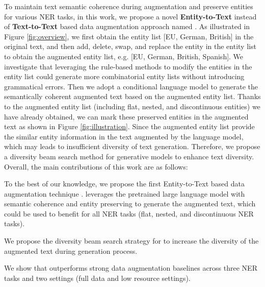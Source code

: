 To maintain text semantic coherence during augmentation and preserve entities for various NER tasks, in this work, we propose a novel \textbf{Entity-to-Text} instead of \textbf{Text-to-Text} based data augmentation approach named {\modelname}. As illustrated in Figure \ref{fig:overview}, we first obtain the entity list [EU, German, British] in the original text, and then add, delete, swap, and replace the entity in the entity list to obtain the augmented entity list, e.g. [EU, German, British, Spanish]. We investigate that leveraging the rule-based methods to modify the entities in the entity list could generate more combinatorial entity lists without introducing grammatical errors. Then we adopt a conditional language model to generate the semantically coherent augmented text based on the augmented entity list. Thanks to the augmented entity list (including flat, nested, and discontinuous entities) we have already obtained, we can mark these preserved entities in the augmented text as shown in Figure \ref{fig:illustration}. Since the augmented entity list provide the 
similar entity information in the text augmented by the language model, which may leads to insufficient diversity of text generation. Therefore, we propose a diversity beam search method for generative models to enhance text diversity.
Overall, the main contributions of this work are as follows:
\squishlist
\item To the best of our knowledge, we propose the first Entity-to-Text based data augmentation technique {\modelname}. {\modelname} leverages the pretrained large language model with semantic coherence and entity preserving to generate the augmented text, which could be used to benefit for all NER tasks (flat, nested, and discontinuous NER tasks).
\item We propose the diversity beam search strategy for {\modelname} to increase the diversity of the augmented text during generation process. 
\item We show that {\modelname} outperforms strong data augmentation baselines across three NER tasks and two settings (full data and low resource settings).
\squishend

